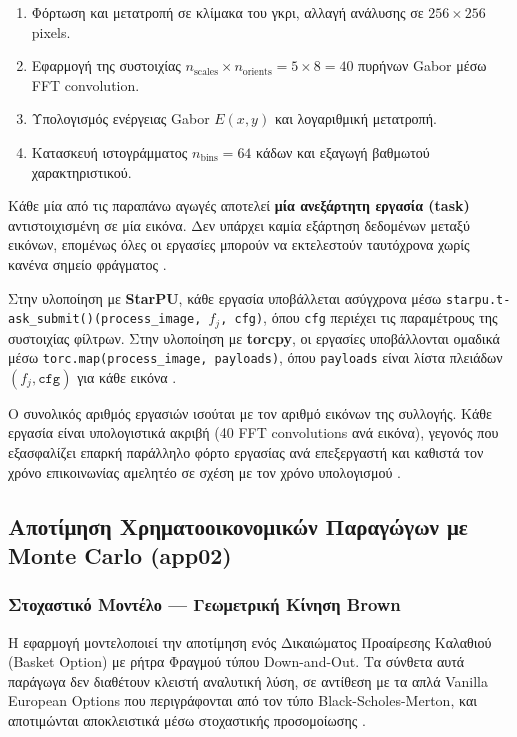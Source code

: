 \begin{enumerate}
  \item Φόρτωση και μετατροπή σε κλίμακα του γκρι, αλλαγή ανάλυσης σε $256\times256$ pixels.
  \item Εφαρμογή της συστοιχίας $n_\mathrm{scales} \times n_\mathrm{orients} = 5\times8 = 40$ πυρήνων Gabor μέσω FFT convolution.
  \item Υπολογισμός ενέργειας Gabor $E(x,y)$ και λογαριθμική μετατροπή.
  \item Κατασκευή ιστογράμματος $n_\mathrm{bins}=64$ κάδων και εξαγωγή βαθμωτού χαρακτηριστικού.
\end{enumerate}

Κάθε μία από τις παραπάνω αγωγές αποτελεί \textbf{μία ανεξάρτητη εργασία (task)} αντιστοιχισμένη σε μία εικόνα. Δεν υπάρχει καμία εξάρτηση δεδομένων μεταξύ εικόνων, επομένως όλες οι εργασίες μπορούν να εκτελεστούν ταυτόχρονα χωρίς κανένα σημείο φράγματος \cite{appcode}.

Στην υλοποίηση με \textbf{StarPU}, κάθε εργασία υποβάλλεται ασύγχρονα μέσω \texttt{starpu.t-\linebreak ask\_submit()(process\_image, $f_j$, cfg)}, όπου \texttt{cfg} περιέχει τις παραμέτρους της συστοιχίας φίλτρων. Στην υλοποίηση με \textbf{torcpy}, οι εργασίες υποβάλλονται ομαδικά μέσω \texttt{torc.map(process\_image, payloads)}, όπου \texttt{payloads} είναι λίστα πλειάδων $(f_j, \texttt{cfg})$ για κάθε εικόνα \cite{appcode}.

Ο συνολικός αριθμός εργασιών ισούται με τον αριθμό εικόνων της συλλογής. Κάθε εργασία είναι υπολογιστικά ακριβή (40 FFT convolutions ανά εικόνα), γεγονός που εξασφαλίζει επαρκή παράλληλο φόρτο εργασίας ανά επεξεργαστή και καθιστά τον χρόνο επικοινωνίας αμελητέο σε σχέση με τον χρόνο υπολογισμού \cite{appcode}.

\subsection{Αποτίμηση Χρηματοοικονομικών Παραγώγων με Monte Carlo (app02)}

\subsubsection{Στοχαστικό Μοντέλο — Γεωμετρική Κίνηση Brown}

Η εφαρμογή μοντελοποιεί την αποτίμηση ενός Δικαιώματος Προαίρεσης Καλαθιού (Basket Option) με ρήτρα Φραγμού τύπου Down-and-Out. Τα σύνθετα αυτά παράγωγα δεν διαθέτουν κλειστή αναλυτική λύση, σε αντίθεση με τα απλά Vanilla European Options που περιγράφονται από τον τύπο Black-Scholes-Merton, και αποτιμώνται αποκλειστικά μέσω στοχαστικής προσομοίωσης \cite{GoddardMC,GilesMC}.


